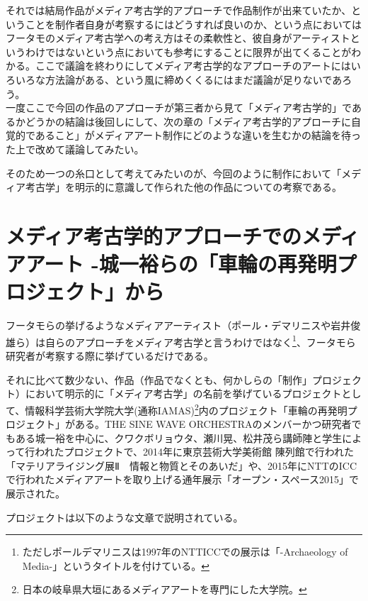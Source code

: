 それでは結局作品がメディア考古学的アプローチで作品制作が出来ていたか、ということを制作者自身が考察するにはどうすれば良いのか、という点においてはフータモのメディア考古学への考え方はその柔軟性と、彼自身がアーティストというわけではないという点においても参考にすることに限界が出てくることがわかる。ここで議論を終わりにしてメディア考古学的なアプローチのアートにはいろいろな方法論がある、という風に締めくくるにはまだ議論が足りないであろう。\\
一度ここで今回の作品のアプローチが第三者から見て「メディア考古学的」であるかどうかの結論は後回しにして、次の章の「メディア考古学的アプローチに自覚的であること」がメディアアート制作にどのような違いを生むかの結論を待った上で改めて議論してみたい。

そのため一つの糸口として考えてみたいのが、今回のように制作において「メディア考古学」を明示的に意識して作られた他の作品についての考察である。

\section{メディア考古学的アプローチでのメディアアート
-城一裕らの「車輪の再発明プロジェクト」から}\label{ux30e1ux30c7ux30a3ux30a2ux8003ux53e4ux5b66ux7684ux30a2ux30d7ux30edux30fcux30c1ux3067ux306eux30e1ux30c7ux30a3ux30a2ux30a2ux30fcux30c8--ux57ceux4e00ux88d5ux3089ux306eux8ecaux8f2aux306eux518dux767aux660eux30d7ux30edux30b8ux30a7ux30afux30c8ux304bux3089}

フータモらの挙げるようなメディアアーティスト（ポール・デマリニスや岩井俊雄ら）は自らのアプローチをメディア考古学と言うわけではなく\footnote{ただしポールデマリニスは1997年のNTTICCでの展示は「-Archaeology
  of Media-」というタイトルを付けている。}、フータモら研究者が考察する際に挙げているだけである。

それに比べて数少ない、作品（作品でなくとも、何かしらの「制作」プロジェクト）において明示的に「メディア考古学」の名前を挙げているプロジェクトとして、情報科学芸術大学院大学(通称IAMAS)\footnote{日本の岐阜県大垣にあるメディアアートを専門にした大学院。}内のプロジェクト「車輪の再発明プロジェクト」がある。THE
SINE WAVE
ORCHESTRAのメンバーかつ研究者でもある城一裕を中心に、クワクボリョウタ、瀬川晃、松井茂ら講師陣と学生によって行われたプロジェクトで、2014年に東京芸術大学美術館
陳列館で行われた「マテリアライジング展Ⅱ　情報と物質とそのあいだ」や、2015年にNTTのICCで行われたメディアアートを取り上げる通年展示「オープン・スペース2015」で展示された。\autocites{iamas:RIWP}{mtrlzng:RIWP}

プロジェクトは以下のような文章で説明されている。

